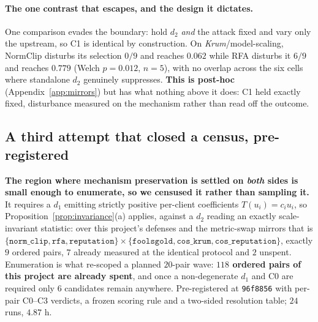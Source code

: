 \documentclass{article}
\begin{document}
\paragraph{The one contrast that escapes, and the design it dictates.} One comparison evades the boundary: hold $d_2$ \emph{and} the attack fixed and vary only the upstream, so C1 is identical by construction. On \emph{Krum}/model-scaling, NormClip disturbs its selection $0/9$ and reaches $0.062$ while RFA disturbs it $6/9$ and reaches $0.779$ (Welch $p{=}0.012$, $n{=}5$), with no overlap across the six cells where standalone $d_2$ genuinely suppresses. \textbf{This is post-hoc} (Appendix~\ref{app:mirrors}) but has what nothing above it does: C1 held exactly fixed, disturbance measured on the mechanism rather than read off the outcome.

\subsection{A third attempt that closed a census, pre-registered}
\label{app:census}

\textbf{The region where mechanism preservation is settled on \emph{both} sides is small enough to enumerate, so we censused it rather than sampling it.} It requires a $d_1$ emitting strictly positive per-client coefficients $T(u_i)=c_iu_i$, so Proposition~\ref{prop:invariance}(a) applies, against a $d_2$ reading an exactly scale-invariant statistic: over this project's defenses and the metric-swap mirrors that is $\{\texttt{norm\_clip},\texttt{rfa},\texttt{reputation}\} \times \{\texttt{foolsgold},\texttt{cos\_krum},\texttt{cos\_reputation}\}$, exactly $9$ ordered pairs, $7$ already measured at the identical protocol and $2$ unspent. Enumeration is what re-scoped a planned $20$-pair wave: \textbf{$118$ ordered pairs of this project are already spent}, and once a non-degenerate $d_1$ and C0 are required only $6$ candidates remain anywhere. Pre-registered at \texttt{96f8856} with per-pair C0--C3 verdicts, a frozen scoring rule and a two-sided resolution table; $24$ runs, $4.87$ h.
\end{document}
